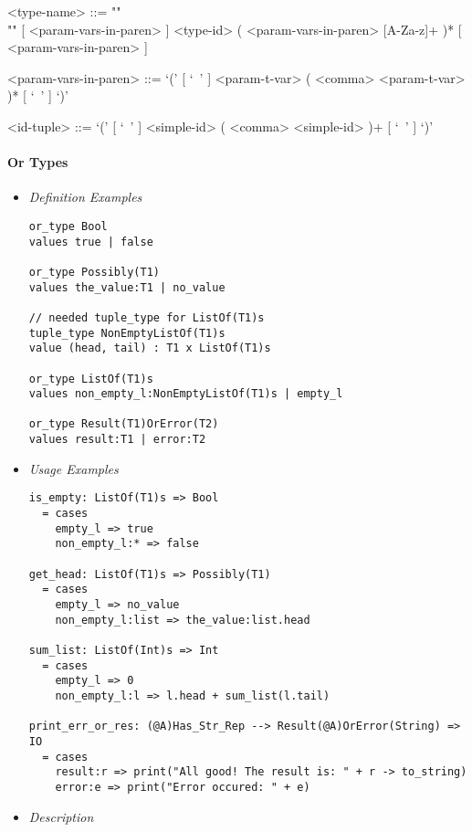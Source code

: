 \documentclass{article}
\begin{document}
\begin{itemize}
\begin{grammar}
<type-name> ::= ""\\""
[ <param-vars-in-paren> ] <type-id> ( <param-vars-in-paren> [A-Za-z]+ )*
[ <param-vars-in-paren> ]

<param-vars-in-paren> ::=
`(' [ `\ ' ] <param-t-var> ( <comma> <param-t-var> )* [ `\ ' ] `)'

<id-tuple> ::= `(' [ `\ ' ] <simple-id> ( <comma> <simple-id> )+ [ `\ ' ] `)'
\end{grammar}

\end{itemize}

\paragraph{Or Types}

\begin{itemize}
\item \textit{Definition Examples}

\begin{verbatim}
or_type Bool
values true | false

or_type Possibly(T1)
values the_value:T1 | no_value

// needed tuple_type for ListOf(T1)s
tuple_type NonEmptyListOf(T1)s
value (head, tail) : T1 x ListOf(T1)s

or_type ListOf(T1)s
values non_empty_l:NonEmptyListOf(T1)s | empty_l

or_type Result(T1)OrError(T2)
values result:T1 | error:T2
\end{verbatim}

\item \textit{Usage Examples}

\begin{verbatim}
is_empty: ListOf(T1)s => Bool
  = cases
    empty_l => true
    non_empty_l:* => false

get_head: ListOf(T1)s => Possibly(T1)
  = cases
    empty_l => no_value
    non_empty_l:list => the_value:list.head

sum_list: ListOf(Int)s => Int
  = cases
    empty_l => 0
    non_empty_l:l => l.head + sum_list(l.tail)

print_err_or_res: (@A)Has_Str_Rep --> Result(@A)OrError(String) => IO
  = cases
    result:r => print("All good! The result is: " + r -> to_string)
    error:e => print("Error occured: " + e)
\end{verbatim}

\item \textit{Description}


\end{itemize}
\end{document}
